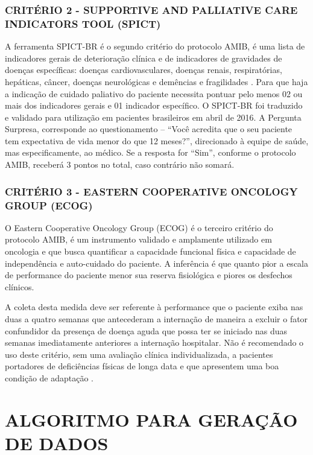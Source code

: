 \documentclass[12pt]{article}
\begin{document}
\subsubsection{CRITÉRIO 2 - SUPPORTIVE AND PALLIATIVE CARE INDICATORS TOOL (SPICT)}

A ferramenta SPICT-BR é o segundo critério do protocolo AMIB, é uma lista de indicadores gerais de deterioração clínica e de indicadores de gravidades de doenças específicas: doenças
cardiovasculares, doenças renais, respiratórias, hepáticas, câncer, doenças neurológicas e
demências e fragilidades \cite{rodriguez2021pergunta}. Para que haja a indicação de cuidado paliativo do paciente necessita pontuar pelo menos 02 ou mais dos indicadores gerais e 01 indicador específico. O SPICT-BR foi traduzido e validado para utilização em pacientes brasileiros em abril de 2016. A Pergunta Surpresa, corresponde ao questionamento – “Você acredita que o seu paciente tem expectativa de vida menor do que 12 meses?”, direcionado à equipe de saúde, mas especificamente, ao médico. Se a resposta for “Sim”, conforme o protocolo AMIB, receberá 3 pontos no total, caso contrário não somará.

\subsubsection{CRITÉRIO 3 - EASTERN COOPERATIVE ONCOLOGY GROUP (ECOG)}
O Eastern Cooperative Oncology Group (ECOG) é o terceiro critério do protocolo AMIB, é um instrumento validado e amplamente utilizado em oncologia e que busca quantificar a capacidade funcional física e capacidade de independência e auto-cuidado do paciente. A inferência é que quanto pior a escala de performance do paciente menor sua reserva fisiológica e piores os desfechos clínicos.

A coleta desta medida deve ser referente à performance que o paciente exiba nas duas a quatro semanas que antecederam a internação de maneira a excluir o fator confundidor da presença de doença aguda que possa ter se iniciado nas duas semanas imediatamente anteriores a internação hospitalar. Não é recomendado o uso deste critério, sem uma avaliação clínica individualizada, a pacientes portadores de deficiências físicas de longa data e que apresentem uma boa condição de adaptação \cite{pinto2000physician}.

\section{ALGORITMO PARA GERAÇÃO DE DADOS}
\end{document}
